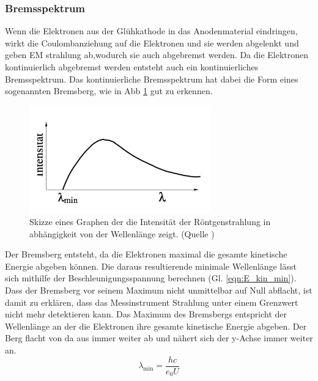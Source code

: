 \subsubsection{Bremsspektrum}
Wenn die Elektronen aus der Glühkathode in das Anodenmaterial eindringen, wirkt die Coulombanziehung auf die Elektronen und sie werden abgelenkt und geben EM strahlung ab,wodurch sie auch abgebremst werden.
Da die Elektronen kontinuierlich abgebremst werden entsteht auch ein kontinuierliches Bremsspektrum.
Das kontinuierliche Bremsspektrum hat dabei die Form eines sogenannten Bremsberg, wie in Abb \ref{fig:Bremsspektrum} gut zu erkennen.
\begin{figure}
    \centering
    \includegraphics[width=0.7\textwidth]{bilder/Bremsspektrum.png}
    \caption{Skizze eines Graphen der die Intensität der Röntgenstrahlung in abhängigkeit von der Wellenlänge zeigt. (Quelle \cite{Anleitung})}
    \label{fig:Bremsspektrum}
\end{figure}
Der Bremsberg entsteht, da die Elektronen maximal die gesamte kinetische Energie abgeben können.
Die daraus resultierende minimale Wellenlänge lässt sich mithilfe der Beschleunigungsspannung berechnen (Gl. \ref{eqn:E_kin_min}).
Dass der Bremsberg vor seinem Maximum nicht unmittelbar auf Null abflacht, ist damit zu erklären, dass das Messinstrument Strahlung unter einem Grenzwert nicht mehr detektieren kann.
Das Maximum des Bremsbergs entspricht der Wellenlänge an der die Elektronen ihre gesamte kinetische Energie abgeben. Der Berg flacht von da aus immer weiter ab und nähert sich der y-Achse immer weiter an.
\begin{equation}
    \lambda_{\text{min}} = \frac{hc}{e_0 U} \label{eqn:E_kin_min}
\end{equation}
